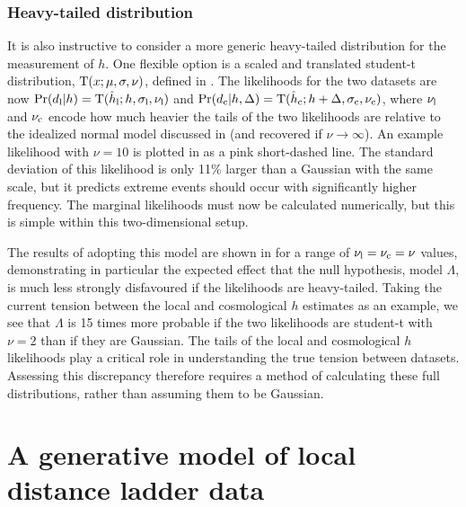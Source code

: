 \documentclass[a4paper,fleqn,usenatbib]{mnras}
\newcommand{\nul}{\nu_{\rm l}}
\newcommand{\nuc}{\nu_{\rm c}}
\newcommand{\msame}{\Lambda}
\newcommand{\hlobs}{\hat{h}_{\rm l}}
\newcommand{\hcobs}{\hat{h}_{\rm c}}
\newcommand{\hlerr}{\sigma_{\rm l}}
\newcommand{\hcerr}{\sigma_{\rm c}}
\newcommand{\datl}{d_{\rm l}}
\newcommand{\datc}{d_{\rm c}}
\begin{document}
{%

\subsubsection{Heavy-tailed distribution}
\label{section:heavy_tailed}

It is also instructive to consider a more generic heavy-tailed
distribution for the measurement of $h$.
One flexible option is a scaled and translated
student-t distribution, 
${\rm T}(x; \mu, \sigma, \nu)$,
defined in .
The likelihoods for the two datasets are now
$\prob(\datl | h) = \student(\hlobs; h, \hlerr, \nul)$
and 
$\prob(\datc | h, \Delta) = \student(\hcobs; h + \Delta, \hcerr, \nuc)$,
where $\nul$ and $\nuc$ encode how much heavier the tails 
of the two likelihoods are relative to the idealized normal model
discussed in  (and recovered if $\nu \rightarrow \infty$).
An example likelihood with $\nu=10$ is plotted in 
 as a pink short-dashed line. The standard 
deviation of this likelihood is only 11\% larger than a Gaussian with 
the same scale, but it predicts extreme events should occur with 
significantly higher frequency. The marginal likelihoods must now 
be calculated numerically, but this is simple within this two-dimensional setup.

The results of adopting this model are shown in 
 for a range of $\nul=\nuc = \nu$ values,
demonstrating in particular the expected effect that the 
null hypothesis, model $\Lambda$, is much less strongly disfavoured
if the likelihoods are heavy-tailed. Taking the 
current tension between the local and cosmological $h$ estimates as an 
example, we see that $\msame$ is 15 times more probable if the two 
likelihoods are student-t with $\nu=2$ than if they are Gaussian. 
The tails of the local and cosmological $h$ likelihoods play a critical 
role in understanding the true tension between datasets. Assessing
this discrepancy therefore requires a method of calculating these full 
distributions, rather than assuming them to be Gaussian.


\section{A generative model of local distance ladder data}
\label{section:ladder}

}
\end{document}
